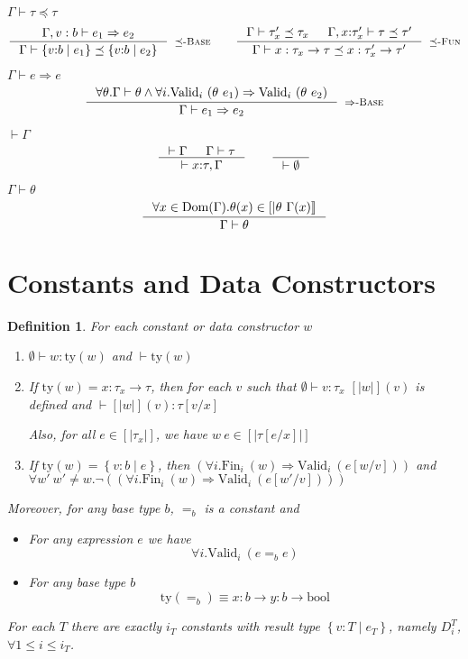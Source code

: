 \documentclass[10pt,a4paper]{article}
\newtheorem{definition}{Definition}
\newcommand\rulename[1]{\textsc{#1}\xspace}
\newcommand\rsubbase{\ensuremath{\preceq}\rulename{-Base}}
\newcommand\rsubfun{\ensuremath{\preceq}\rulename{-Fun}}
\newcommand\rsubcon{\ensuremath{\preceq}\rulename{-Con}}
\newcommand\rimpl{\ensuremath{\Rightarrow}\rulename{-Base}}
\newcommand\dcti{\dct{i}}
\newcommand\dct[1]{\ensuremath{D^T_{#1}}}
\newcommand\eapp[2]{\ensuremath{#1 \ #2}}
\newcommand\tbool{\ensuremath{\text{bool}}}
\newcommand\tref[3]{\ensuremath{\left\lbrace {#1} \colon {#2} \mid {#3} \right\rbrace}}
\newcommand\tconref[4]{\tref{#3}{\tcon{#1}{#2}}{#4}}
\newcommand\tcon[2]{\ensuremath{#1\ #2}}
\newcommand\tfun[3]{\ensuremath{#1\colon #2 \rightarrow #3}}
\newcommand\eqb[1]{\ensuremath{=_{#1}}}
\newcommand\validi[1]{\ensuremath{\text{Valid}_{i}\ (#1)}}
\newcommand\fini[1]{\ensuremath{\text{Fin}_{i}\ (#1)}}
\newcommand\generalconditionInterp[2]
	{\ensuremath{(\forall i. \fini{#1} \Rightarrow \validi{#2})}}
\newcommand\generalconditionImpl[2]
	{\ensuremath{\forall i . \validi{#1} \Rightarrow \validi{#2}}}
\newcommand\generalconditionImplOne[1]
	{\ensuremath{\forall i . \validi{#1}}}
\newcommand\ty[1]{\ensuremath{\text{ty}({#1})}}
\newcommand\sub[2]{\ensuremath{\left[ #2 / #1 \right]}}
\newcommand\interp[1]{\ensuremath{[|#1|]}}
\newcommand\hastype[3]{\ensuremath{#1 \vdash #2 \colon #3}}
\newcommand\iswellformed[2]{\ensuremath{#1 \vdash #2}}
\newcommand\issubtype[3]{\ensuremath{#1 \vdash #2 \preceq #3}}
\newcommand\issubref[3]{\ensuremath{#1 \vdash #2 \Rightarrow #3}}
\begin{document}
\hfill\mbox{\issubtype{\Gamma}{\tau}{\tau}}
$$
\inference{
	\issubref{\Gamma, v:b}{e_1}{e_2}
}{
	\issubtype{\Gamma}{\tref{v}{b}{e_1}}{\tref{v}{b}{e_2}}
}[\rsubbase]
\qquad
\inference{
	\issubtype{\Gamma}{\tau'_x}{\tau_x} &&
	\issubtype{\Gamma, x \colon \tau'_x}{\tau}{\tau'}
}{
	\issubtype{\Gamma}{x:\tau_x \rightarrow \tau}{x:\tau'_x \rightarrow \tau'}
}[\rsubfun]
$$

\hfill\mbox{\issubref{\Gamma}{e}{e}}
$$
\inference{
	\forall \theta. \iswellformed{\Gamma}{\theta} \land
	\generalconditionImpl{\theta\ e_1}{\theta\ e_2}
}{
	\issubref{\Gamma}{e_1}{e_2}
}[\rimpl]
$$

\hfill\mbox{\iswellformed{}{\Gamma}}
$$
\inference{
	\iswellformed{}{\Gamma} &&
	\iswellformed{\Gamma}{\tau}
}{
	\iswellformed{}{x\colon\tau,\Gamma}
}
\qquad
\inference{}{\iswellformed{}{\emptyset}}
$$


\hfill\mbox{\iswellformed{\Gamma}{\theta}}
$$
\inference{
	\forall x \in \text{Dom}(\Gamma). 
	\theta(x) \in \interp{\theta \ \Gamma(x)}
}{
	\iswellformed{\Gamma}{\theta}
}
$$


\section*{Constants and Data Constructors}
\begin{definition}\label{def:constants}
For each constant or data constructor $w$

\newcommand\const{\ensuremath{w}}
\begin{enumerate}
\item \hastype{\emptyset}{\const}{\ty{\const}} and \iswellformed{}{\ty{\const}}
\item If $\ty{\const} = \tfun{x}{\tau_x}{\tau}$, then for each $v$ such that
\hastype{\emptyset}{v}{\tau_x} $\interp{\const}(v)$ is defined and
\hastype{}{\interp{\const}(v)}{\tau\sub{x}{v}}

Also, for all $e\in\interp{\tau_x}$, we have $\eapp{\const}{e}\in\interp{\tau\sub{x}{e}}$

\item If $\ty{\const} = \tref{v}{b}{e}$, 
then \generalconditionInterp{\const}{e\sub{v}{\const}} and 
$\forall \const'\ \const' \neq \const. \lnot (\generalconditionInterp{\const}{e\sub{v}{\const'}})$ 
\end{enumerate}
Moreover, for any base type $b$, \eqb{b} is a constant and 
\begin{itemize}
\item For any expression $e$ we have 
$$\generalconditionImplOne{e \eqb{b} e}$$
\item For any base type $b$ 
$$\ty{=_b} \equiv \tfun{x}{b}{\tfun{y}{b}{\tbool}}$$
\end{itemize}

For each $T$ there are exactly $i_T$ constants with result type $\tref{v}{T}{e_T}$, 
namely   $\dcti$, $\forall 1 \leq i \leq i_T$.
\end{definition}
\end{document}
